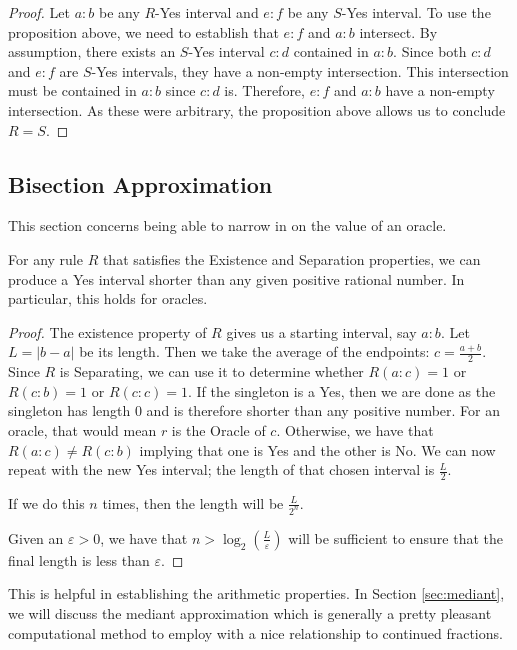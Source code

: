 \documentclass[12pt]{article}
\begin{document}
\begin{proof}
Let $a:b$ be any $R$-Yes interval and $e:f$ be any $S$-Yes interval. To use the proposition above, we need to establish that $e:f$ and $a:b$ intersect. By assumption, there exists an $S$-Yes interval $c:d$ contained in $a:b$. Since both $c:d$ and $e:f$ are $S$-Yes intervals, they have a non-empty intersection. This intersection must be contained in $a:b$ since $c:d$ is. Therefore, $e:f$ and $a:b$ have a non-empty intersection. As these were arbitrary, the proposition above allows us to conclude $R=S$.
\end{proof}


\subsection{Bisection Approximation}

This section concerns being able to narrow in on the value of an oracle. 

\begin{proposition}\label{pr:short}
For any rule $R$ that satisfies the Existence and Separation properties, we can produce a Yes interval shorter than any given positive rational number. In particular, this holds for oracles. 
\end{proposition}

\begin{proof}
The existence property of $R$ gives us a starting interval, say $a:b$. Let $L = |b-a|$ be its length. Then we take the average of the endpoints: $c = \frac{a+b}{2}$. Since $R$ is Separating, we can use it to determine whether $R(a:c) = 1$ or $R(c:b) = 1$ or $R(c:c) = 1$. If the singleton is a Yes, then we are done as the singleton has length 0 and is therefore shorter than any positive number. For an oracle, that would mean $r$ is the Oracle of $c$. Otherwise, we have that $R(a:c) \neq R(c:b)$ implying that one is Yes and the other is No. We can now repeat with the new Yes interval; the length of that chosen interval is $\frac{L}{2}$. 

If we do this $n$ times, then the length will be $\frac{L}{2^n}$. 

Given an $\varepsilon >0 $, we have that $n > \log_2 (\frac{L}{\varepsilon})$ will be sufficient to ensure that the final length is less than $\varepsilon$. 
    \end{proof}


This is helpful in establishing the arithmetic properties. In Section \ref{sec:mediant}, we will discuss the mediant approximation which is generally a pretty pleasant computational method to employ with a nice relationship to continued fractions. 
\end{document}
